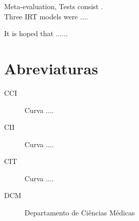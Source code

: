 

\TitlePage
  \vspace*{45mm}
  {Meta-evaluation,}
  \vspace{10mm}
       {Tests consist .\\[1ex]
        Three IRT models were ....}
  \TEXT{}
       {}
\vspace*{10mm}
\EndTitlePage


\TitlePage
  \vspace*{40mm}
  \TEXT{}
       {It is hoped that ......
}
  \TEXT{}
       {}
\vspace*{10mm}
\EndTitlePage




\tableofcontents

\cleardoublepage

\listoffigures

\cleardoublepage

\listoftables

\cleardoublepage


\chapter*{Abreviaturas}

\begin{description}
\item[CCI]  {Curva ....}
\item[CII]  {Curva ....}
\item[CIT]  {Curva ....}
\item[DCM]  {Departamento de Ci\^encias M\'edicas}
\end{description}


\cleardoublepage

